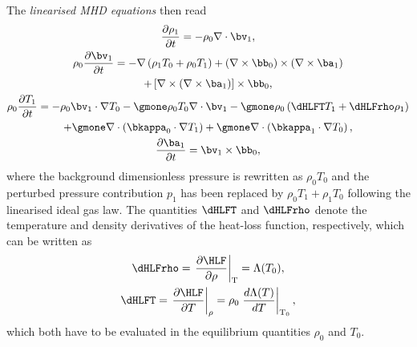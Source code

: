 The \emph{linearised MHD equations} then read
\begin{gather}
  \frac{\partial \rho_1}{\partial t} = -\rho_0 \nabla \cdot \bv_1, \label{eq: linearised_rho1_homo}\\
  \rho_0 \frac{\partial \bv_1}{\partial t} =
    -\nabla\left(\rho_1 T_0 + \rho_0 T_1\right)
    +\left(\nabla \times \bb_0\right) \times \left(\nabla \times \ba_1\right) \nonumber \\
    +\left[\nabla \times \left(\nabla \times \ba_1\right)\right] \times \bb_0, \\
  \rho_0\frac{\partial T_1}{\partial t} =
    -\rho_0\bv_1 \cdot \nabla T_0
    -\gmone \rho_0 T_0 \nabla \cdot \bv_1
    -\gmone \rho_0 \left(\dHLFT T_1 + \dHLFrho \rho_1\right) \nonumber \\
    +\gmone \nabla \cdot \left(\bkappa_0 \cdot \nabla T_1\right)
    +\gmone \nabla \cdot \left(\bkappa_1 \cdot \nabla T_0\right), \\
  \frac{\partial \ba_1}{\partial t} = \bv_1 \times \bb_0, \label{eq: linearised_A1_homo}
\end{gather}
where the background dimensionless pressure is rewritten as $\rho_0 T_0$ and the perturbed pressure contribution $p_1$ has been replaced by $\rho_0 T_1 + \rho_1 T_0$ following the linearised ideal gas law. The quantities $\dHLFT$ and $\dHLFrho$ denote the temperature and density derivatives of the heat-loss function, respectively, which can be written as
\begin{equation}
  \begin{gathered}
    \dHLFrho = \left.\frac{\partial \HLF}{\partial \rho}\right|_\text{T} = \Lambda(T_0), \\
    \dHLFT = \left.\frac{\partial \HLF}{\partial T}\right|_\rho =
      \rho_0 \left.\frac{d\Lambda(T)}{dT}\right|_{\text{T}_0},
  \end{gathered}
\end{equation}
which both have to be evaluated in the equilibrium quantities $\rho_0$ and $T_0$.

